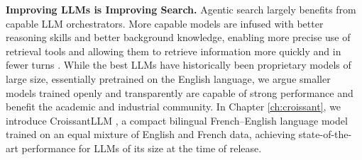 

\noindent\textbf{Improving LLMs is Improving Search.} Agentic search largely benefits from capable LLM orchestrators. More capable models are infused with better reasoning skills and better background knowledge, enabling more precise use of retrieval tools and allowing them to retrieve information more quickly and in fewer turns . While the best LLMs have historically been proprietary models of large size, essentially pretrained on the English language, we argue smaller models trained openly and transparently are capable of strong performance and benefit the academic and industrial community. In Chapter \autoref{ch:croissant}, we introduce CroissantLLM , a compact bilingual French--English language model trained on an equal mixture of English and French data, achieving state-of-the-art performance for LLMs of its size at the time of release.




